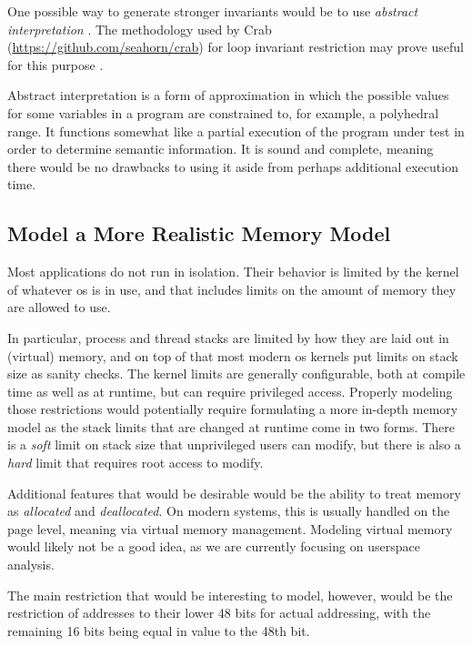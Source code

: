 One possible way to generate stronger invariants would be to use
\emph{abstract interpretation}
\autocite{cousot1976static,cousot1977aiu}.
The methodology used by Crab (\url{https://github.com/seahorn/crab})
for loop invariant restriction may prove useful for this purpose
\autocite{gange2016abstract}.

Abstract interpretation is a form of approximation
in which the possible values for some variables in a program
are constrained to, for example, a polyhedral range.
It functions somewhat like a partial execution of the program under test
in order to determine semantic information.
It is sound and complete, meaning there would be no drawbacks to using it
aside from perhaps additional execution time.

\subsection{Model a More Realistic Memory Model}
Most applications do not run in isolation. Their behavior is limited by
the kernel of whatever \ac{os} is in use,
and that includes limits on the amount of memory they are allowed to use.

In particular, process and thread stacks are limited
by how they are laid out in (virtual) memory, and on top of that
most modern \ac{os} kernels put limits on stack size as sanity checks.
The kernel limits are generally configurable,
both at compile time as well as at runtime, but can require privileged access.
Properly modeling those restrictions
would potentially require formulating a more in-depth memory model
as the stack limits that are changed at runtime come in two forms.
There is a \emph{soft} limit on stack size that unprivileged users
can modify, but there is also a \emph{hard} limit
that requires root access to modify.

Additional features that would be desirable
would be the ability to treat memory as \emph{allocated} and \emph{deallocated}.
On modern systems, this is usually handled on the page level,
meaning via virtual memory management.
Modeling virtual memory would likely not be a good idea,
as we are currently focusing on userspace analysis.

The main restriction that would be interesting to model, however,
would be the restriction of addresses to their lower 48 bits for actual addressing,
with the remaining 16 bits being equal in value to the 48th bit.
